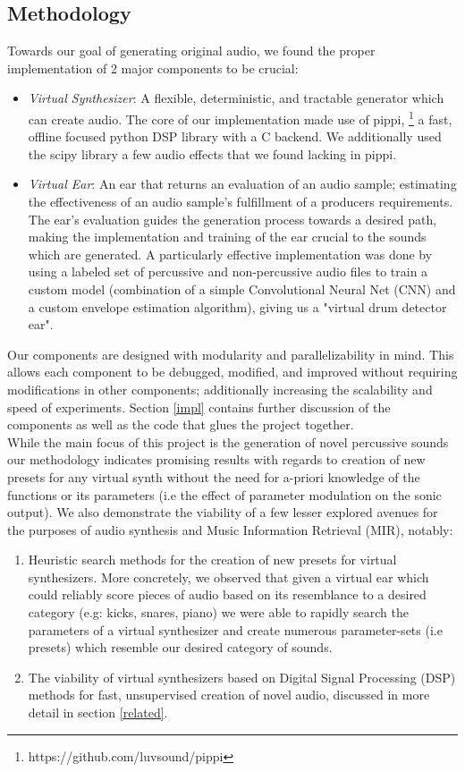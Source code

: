 \documentclass{nime-alternate} %
\begin{document}
\subsection{Methodology}
Towards our goal of generating original audio, we found the proper implementation of 2 major components to be crucial:
\begin{itemize}
    \item \textit{Virtual Synthesizer}: A flexible, deterministic, and tractable generator which can create audio. The core of our implementation made use of pippi, \footnote{https://github.com/luvsound/pippi} a fast, offline focused python DSP library with a C backend. We additionally used the scipy\cite{jones2001scipy} library a few audio effects that we found lacking in pippi. 
    \item \textit{Virtual Ear}: An ear that returns an evaluation of an audio sample; estimating the effectiveness of an audio sample's fulfillment of a producers requirements. The ear's evaluation guides the generation process towards a desired path, making the implementation and training of the ear crucial to the sounds which are generated. A particularly effective implementation was done by using a labeled set of percussive and non-percussive audio files to train a custom model (combination of a simple Convolutional Neural Net (CNN) and a custom envelope estimation algorithm), giving us a "virtual drum detector ear". \\
\end{itemize}
Our components are designed with modularity and parallelizability in mind. This allows each component to be debugged, modified, and improved without requiring modifications in other components; additionally increasing the scalability and speed of experiments.
Section \ref{impl} contains further discussion of the components as well as the code that glues the project together.\\ 
While the main focus of this project is the generation of novel percussive sounds our methodology indicates promising results with regards to creation of new presets for any virtual synth without the need for a-priori knowledge of the functions or its parameters (i.e the effect of parameter modulation on the sonic output). We also demonstrate the viability of a few lesser explored avenues for the purposes of audio synthesis and Music Information Retrieval (MIR), notably:
\begin{enumerate}[label=\roman*]
\item Heuristic search methods for the creation of new presets for virtual synthesizers. More concretely, we observed that given a virtual ear which could reliably score pieces of audio based on its resemblance to a desired category (e.g: kicks, snares, piano) we were able to rapidly search the parameters of a virtual synthesizer and create numerous parameter-sets (i.e presets) which resemble our desired category of sounds.
\item The viability of virtual synthesizers based on Digital Signal Processing (DSP) methods for fast, unsupervised creation of novel audio, discussed in more detail in section \ref{related}. \\
\end{enumerate}
\end{document}
